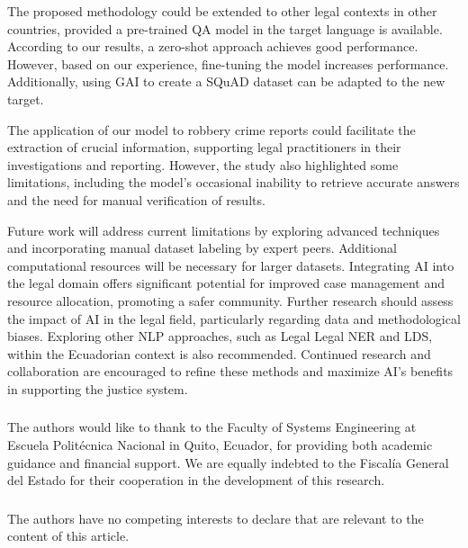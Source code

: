 \documentclass[runningheads]{llncs}
\begin{document}
The proposed methodology could be extended to other legal contexts in
other countries, provided a pre-trained \ac{QA} model in the target
language is available. According to our results, a zero-shot approach
achieves good performance. However, based on our experience,
fine-tuning the model increases performance. Additionally, using
\ac{GAI} to create a \ac{SQuAD} dataset can be adapted to the new
target.

The application of our model to robbery crime reports could facilitate
the extraction of crucial information, supporting legal practitioners
in their investigations and reporting. However, the study also
highlighted some limitations, including the model's occasional
inability to retrieve accurate answers and the need for manual
verification of results.

Future work will address current limitations by exploring advanced
techniques and incorporating manual dataset labeling by expert
peers. Additional computational resources will be necessary for larger
datasets. Integrating AI into the legal domain offers significant
potential for improved case management and resource allocation,
promoting a safer community. Further research should assess the impact
of AI in the legal field, particularly regarding data and
methodological biases. Exploring other NLP approaches, such as Legal
Legal \ac{NER} and \ac{LDS}, within the Ecuadorian context is also
recommended. Continued research and collaboration are encouraged to
refine these methods and maximize AI's benefits in supporting the
justice system.



\begin{credits}
  \subsubsection{\ackname}
  The authors would like to thank to the Faculty of Systems
  Engineering at Escuela Politécnica Nacional in Quito, Ecuador, for
  providing both academic guidance and financial support. We are
  equally indebted to the Fiscalía General del Estado for their
  cooperation in the development of this research.

\subsubsection{\discintname}
The authors have no competing interests to declare that are relevant
to the content of this article.
\end{credits}
%
%
%


% 
\end{document}
